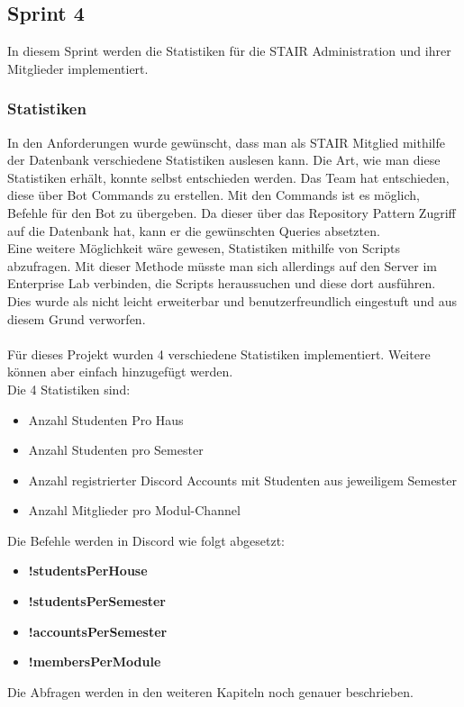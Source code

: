 \documentclass[a4paper, table]{article}
\begin{document}
\newpage
\subsection{Sprint 4}
In diesem Sprint werden die Statistiken für die STAIR Administration und ihrer Mitglieder implementiert.

\subsubsection{Statistiken}
In den Anforderungen wurde gewünscht, dass man als STAIR Mitglied mithilfe der Datenbank verschiedene Statistiken auslesen kann.
Die Art, wie man diese Statistiken erhält, konnte selbst entschieden werden.
Das Team hat entschieden, diese über Bot Commands zu erstellen.
Mit den Commands ist es möglich, Befehle für den Bot zu übergeben.
Da dieser über das Repository Pattern Zugriff auf die Datenbank hat, kann er die gewünschten Queries absetzten.\\
Eine weitere Möglichkeit wäre gewesen,  Statistiken mithilfe von Scripts abzufragen.
Mit dieser Methode müsste man sich allerdings auf den Server im Enterprise Lab verbinden, die Scripts heraussuchen und diese dort ausführen.
Dies wurde als nicht leicht erweiterbar und benutzerfreundlich eingestuft und aus diesem Grund verworfen.\\\\
Für dieses Projekt wurden 4 verschiedene Statistiken implementiert.
Weitere können aber einfach hinzugefügt werden.\\
Die 4 Statistiken sind:
\begin{itemize}
    \item Anzahl Studenten Pro Haus
    \item Anzahl Studenten pro Semester
    \item Anzahl registrierter Discord Accounts mit Studenten aus jeweiligem Semester
    \item Anzahl Mitglieder pro Modul-Channel
\end{itemize}
Die Befehle werden in Discord wie folgt abgesetzt:
\begin{itemize}
    \item \textbf{!studentsPerHouse}
    \item \textbf{!studentsPerSemester}
    \item \textbf{!accountsPerSemester}
    \item \textbf{!membersPerModule}
\end{itemize}
Die Abfragen werden in den weiteren Kapiteln noch genauer beschrieben.
\end{document}
